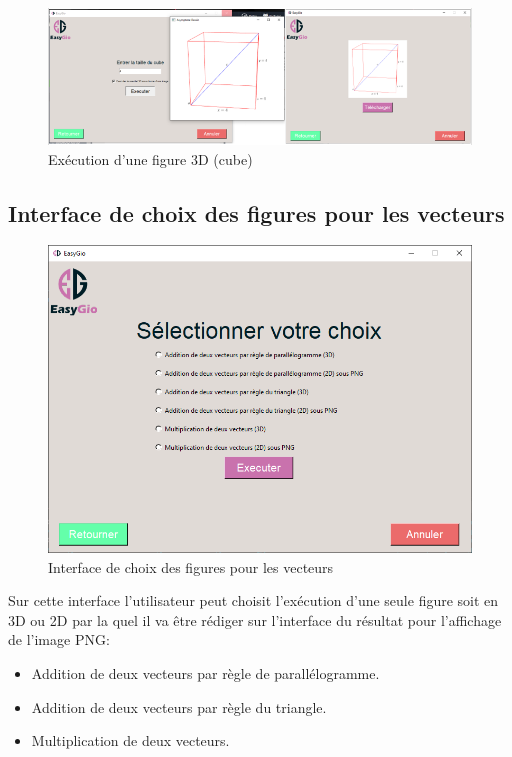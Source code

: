 \documentclass[a4paper]{report}
\begin{document}
\begin{figure}[!h]
    \centering
    \includegraphics[width=15cm]{images/CubeT.PNG}
    \caption{Exécution d'une figure 3D (cube)}
    \label{fig:Exécution d'un figure 3D (cube)}
\end{figure}
\subsection{Interface de choix des figures pour les vecteurs}
\begin{figure}[!h]
    \centering
    \includegraphics[width=12cm]{images/Vecteur.PNG}
    \caption{Interface de choix des figures pour les vecteurs}
    \label{fig:Interface de choix des figures pour les vecteurs}
\end{figure}
Sur cette interface l'utilisateur peut choisit l'exécution d'une seule figure soit en 3D ou 2D par la quel il va être rédiger sur l'interface du résultat pour l'affichage de l'image PNG:
\begin{itemize}
    \item Addition de deux vecteurs par règle de parallélogramme.
    \item Addition de deux vecteurs par règle du triangle.
    \item Multiplication de deux vecteurs.
\end{itemize}
\end{document}
